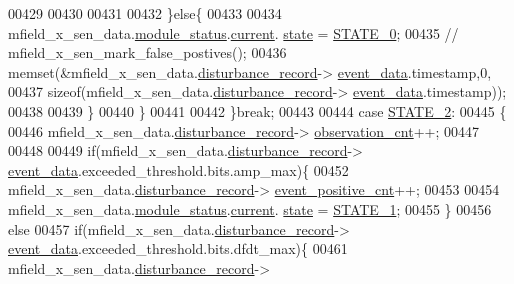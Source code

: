\begin{DoxyCode}
00429 
00430 
00431 
00432                      \}\textcolor{keywordflow}{else}\{
00433 
00434                          mfield\_x\_sen\_data.\hyperlink{a00025_adfab5a5d8b45a93dfb13edb24e2b80e3}{module\_status}.\hyperlink{a00019_acf41ffc11da291c2f9f0fcb02ee72b98}{current}.
      \hyperlink{a00019_a6b8d8e916bc56265a3fd279bd26b6d1b}{state} = \hyperlink{a00021_ad6739dbbe5581cac99b7dc8a5e09949c}{STATE\_0};
00435                         \textcolor{comment}{// mfield\_x\_sen\_mark\_false\_postives();}
00436                          memset(&mfield\_x\_sen\_data.\hyperlink{a00025_ac9b38e2c1d3f1013a88d33506c754152}{disturbance\_record}->
      \hyperlink{a00028_a8c0bda69e71ef674e60da47ad0be9ab0}{event\_data}.timestamp,0,
00437                                  \textcolor{keyword}{sizeof}(mfield\_x\_sen\_data.\hyperlink{a00025_ac9b38e2c1d3f1013a88d33506c754152}{disturbance\_record}->
      \hyperlink{a00028_a8c0bda69e71ef674e60da47ad0be9ab0}{event\_data}.timestamp));
00438 
00439                     \}
00440              \}
00441 
00442         \}\textcolor{keywordflow}{break};
00443 
00444          \textcolor{keywordflow}{case} \hyperlink{a00021_a66fa48e832a64af4d405511cecc4c752}{STATE\_2}: 
00445         \{
00446             mfield\_x\_sen\_data.\hyperlink{a00025_ac9b38e2c1d3f1013a88d33506c754152}{disturbance\_record}->
      \hyperlink{a00028_ad5b0bac02ce266b91b2b52a1c3ea1d78}{observation\_cnt}++;
00447 
00448 
00449             \textcolor{keywordflow}{if}(mfield\_x\_sen\_data.\hyperlink{a00025_ac9b38e2c1d3f1013a88d33506c754152}{disturbance\_record}->
      \hyperlink{a00028_a8c0bda69e71ef674e60da47ad0be9ab0}{event\_data}.exceeded\_threshold.bits.amp\_max)\{
00452                  mfield\_x\_sen\_data.\hyperlink{a00025_ac9b38e2c1d3f1013a88d33506c754152}{disturbance\_record}->
      \hyperlink{a00028_a7397b9d76d4b57500f27bb23d258a18a}{event\_positive\_cnt}++;
00453 
00454                  mfield\_x\_sen\_data.\hyperlink{a00025_adfab5a5d8b45a93dfb13edb24e2b80e3}{module\_status}.\hyperlink{a00019_acf41ffc11da291c2f9f0fcb02ee72b98}{current}.
      \hyperlink{a00019_a6b8d8e916bc56265a3fd279bd26b6d1b}{state} = \hyperlink{a00021_a727351838367f27ac0adb9a13422c342}{STATE\_1};
00455             \}
00456             \textcolor{keywordflow}{else}
00457              \textcolor{keywordflow}{if}(mfield\_x\_sen\_data.\hyperlink{a00025_ac9b38e2c1d3f1013a88d33506c754152}{disturbance\_record}->
      \hyperlink{a00028_a8c0bda69e71ef674e60da47ad0be9ab0}{event\_data}.exceeded\_threshold.bits.dfdt\_max)\{
00461                mfield\_x\_sen\_data.\hyperlink{a00025_ac9b38e2c1d3f1013a88d33506c754152}{disturbance\_record}->

\end{DoxyCode}
